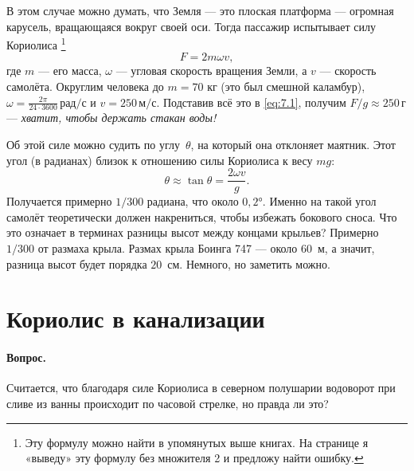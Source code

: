 В этом случае можно думать, что Земля --- это плоская платформа --- огромная карусель, вращающаяся вокруг своей оси.
Тогда пассажир испытывает силу Кориолиса%
\footnote{Эту формулу можно найти в упомянутых выше книгах. На странице \pageref{Парадокс с Кориолисом} я «выведу» эту формулу без множителя 2 и предложу найти ошибку.}
\begin{equation}
F=2 m \omega v,
\label{eq:7.1}
\end{equation}
где $m$ --- его масса,
$\omega$ --- угловая скорость вращения Земли,
а $v$ --- скорость самолёта.
Округлим человека до $m=70$ кг (это был смешной каламбур),
$\omega=\tfrac{2\pi}{24 \cdot 3600}\,\text{рад/с}$ и
$v=250 \,\text{м/с}$.
Подставив всё это в \eqref{eq:7.1}, получим
$F/g \approx 250 \,\text{г}$ --- \emph{хватит, чтобы держать стакан воды!}

Об этой силе можно судить по углу~$\theta$, на который она отклоняет маятник.
Этот угол (в радианах) близок к отношению силы Кориолиса к весу $mg$:
\[\theta \approx \tan\theta=\frac{2 \omega v}{g}.\]
Получается примерно $1/300$ радиана, что около $0{,}2$°.
Именно на такой угол самолёт теоретически должен накрениться, чтобы избежать бокового сноса.
Что это означает в терминах разницы высот между концами крыльев?
Примерно $1/300$ от размаха крыла.
Размах крыла Боинга 747 — около $60$~м, а значит, разница высот будет порядка $20$~см.
Немного, но заметить можно.

\section{Кориолис в канализации}

\paragraph{Вопрос.}
Считается, что благодаря силе Кориолиса в северном полушарии водоворот при сливе из ванны происходит по часовой стрелке, но правда ли это?

